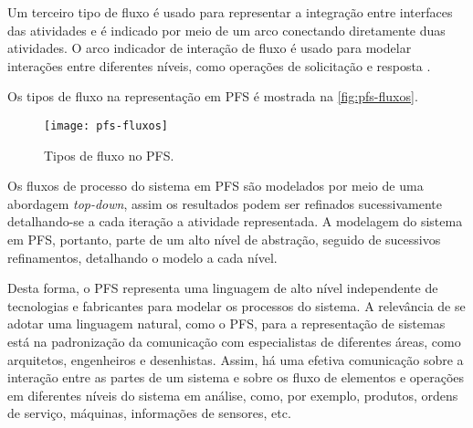 	Um terceiro tipo de fluxo é usado para representar a integração entre interfaces das atividades e é indicado por meio de um arco conectando diretamente duas atividades. O arco indicador de interação de fluxo é usado para modelar interações entre diferentes níveis, como operações de solicitação e resposta \cite{pisching2018pfs}.
	
	Os tipos de fluxo na representação em PFS é mostrada na \autoref{fig:pfs-fluxos}.
	
	\begin{figure}[htb]
		\centering
		\label{fig:pfs-fluxos}
		\texttt{[image: pfs-fluxos]}
		\caption{Tipos de fluxo no PFS.}
	\end{figure}
	
	Os fluxos de processo do sistema em PFS são modelados por meio de uma abordagem \textit{top-down}, assim os resultados podem ser refinados sucessivamente detalhando-se a cada iteração a atividade representada. A modelagem do sistema em PFS, portanto, parte de um alto nível de abstração, seguido de sucessivos refinamentos, detalhando o modelo a cada nível.
	
	Desta forma, o PFS representa uma linguagem de alto nível independente de tecnologias e fabricantes para modelar os processos do sistema. A relevância de se adotar uma linguagem natural, como o PFS, para a representação de sistemas está na padronização da comunicação com especialistas de diferentes áreas, como arquitetos, engenheiros e desenhistas. Assim, há uma efetiva comunicação sobre a interação entre as partes de um sistema e sobre os fluxo de elementos e operações em diferentes níveis do sistema em análise, como, por exemplo, produtos, ordens de serviço, máquinas, informações de sensores, etc.
